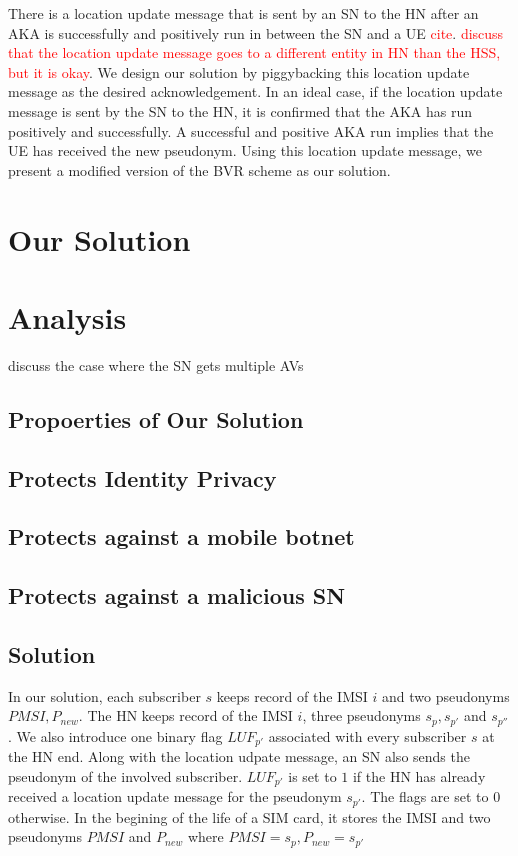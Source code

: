 \documentclass{llncs} %
\begin{document}
There is a location update message that is sent by an SN to the HN after an AKA is successfully and positively run in between the SN and a UE \textcolor{red}{cite}. \textcolor{red}{discuss that the location update message goes to a different entity in HN than the HSS, but it is okay}. We design our solution by piggybacking this location update message as the desired acknowledgement. In an ideal case, if the location update message is sent by the SN to the HN, it is confirmed that the AKA has run positively and successfully. A successful and positive AKA run implies that the  UE has received the new pseudonym. Using this location update message, we present a modified version of the BVR scheme as our solution.

\section{Our Solution}

\section{Analysis}
discuss the case where the SN gets multiple AVs
\subsection{Propoerties of Our Solution}
\subsection{Protects Identity Privacy}
\subsection{Protects against a mobile botnet}
\subsection{Protects against a malicious SN}

\subsection{Solution}
In our solution, each subscriber $s$ keeps record of the IMSI $i$ and two pseudonyms $PMSI,P_{new}$. The HN keeps record of the IMSI $i$, three pseudonyms $s_p,s_{p'}$ and $s_{p''}$. We also introduce one binary flag $LUF_{p'}$ associated with every subscriber $s$ at the HN end. Along with the location udpate message, an SN also sends the pseudonym of the involved subscriber.  $LUF_{p'}$ is set to $1$ if the HN has already received a location update message for the pseudonym $s_{p'}$. The flags are set to $0$ otherwise. In the begining of the life of a SIM card, it stores the IMSI and two pseudonyms $PMSI$ and $P_{new}$ where $PMSI = s_p, P_{new} = s_{p'}$
\end{document}

